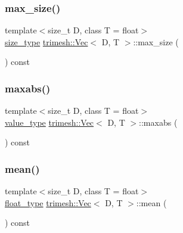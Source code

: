 \mbox{\label{classtrimesh_1_1Vec_ae3bae37a0f378cd5dc29e138f1352b50}} 
\subsubsection{\texorpdfstring{max\+\_\+size()}{max\_size()}}
{\footnotesize\ttfamily template$<$size\+\_\+t D, class T = float$>$ \\
\hyperlink{classtrimesh_1_1Vec_a65397e05ed96e7723cf2d54dfff0ad0a}{size\+\_\+type} \hyperlink{classtrimesh_1_1Vec}{trimesh\+::\+Vec}$<$ D, T $>$\+::max\+\_\+size (\begin{DoxyParamCaption}{ }\end{DoxyParamCaption}) const\hspace{0.3cm}{\ttfamily [inline]}}

\mbox{\label{classtrimesh_1_1Vec_accc74f2ddcda684a3c2f16d11c8db490}} 
\subsubsection{\texorpdfstring{maxabs()}{maxabs()}}
{\footnotesize\ttfamily template$<$size\+\_\+t D, class T = float$>$ \\
\hyperlink{classtrimesh_1_1Vec_a10a59253996e42d67c713f37592669df}{value\+\_\+type} \hyperlink{classtrimesh_1_1Vec}{trimesh\+::\+Vec}$<$ D, T $>$\+::maxabs (\begin{DoxyParamCaption}{ }\end{DoxyParamCaption}) const\hspace{0.3cm}{\ttfamily [inline]}}

\mbox{\label{classtrimesh_1_1Vec_a9e94aafd3b2da3fe7006552783877c18}} 
\subsubsection{\texorpdfstring{mean()}{mean()}}
{\footnotesize\ttfamily template$<$size\+\_\+t D, class T = float$>$ \\
\hyperlink{classtrimesh_1_1Vec_a2593716457a143008832235a3e4a9155}{float\+\_\+type} \hyperlink{classtrimesh_1_1Vec}{trimesh\+::\+Vec}$<$ D, T $>$\+::mean (\begin{DoxyParamCaption}{ }\end{DoxyParamCaption}) const\hspace{0.3cm}{\ttfamily [inline]}}

